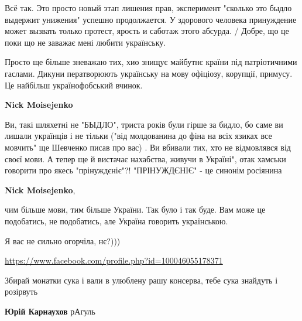 \begin{itemize}
Всё так. Это просто новый этап лишения прав, эксперимент "сколько это быдло
выдержит унижения" успешно продолжается. У здорового человека принуждение может
вызвать только протест, ярость и саботаж этого абсурда. / Добре, що це поки що
не заважає мені любити українську. 

Просто ще більше зневажаю тих, хио знищує майбутнє країни під патріотичними
гаслами. Дикуни ператворюють українську на мову офіціозу, корупції, примусу. Це
найбільш українофобський вчинок.

\begin{itemize}

\textbf{Nick Moisejenko} 

Ви, такі шляхетні не "БЫДЛО", триста років були гірше
за бидло, бо саме ви лишали українців і не тільки ("від молдованина до фіна на
всіх язиках все мовчить" ще Шевченко писав про вас) . Ви вбивали тих, хто не
відмовлявся від своєї мови. А тепер ще й вистачає нахабства, живучи в Україні",
отак хамськи говорити про якесь "прінуждєніє"?! "ПРІНУЖДЄНІЄ" - це синонім
росіянина


\textbf{Nick Moisejenko}, 

чим більше мови, тим більше України. Так було і так буде. Вам може це
подобатись, не подобатись, але Україна говорить українською.

Я вас не сильно огорчіла, нє?)))\Laughey[1.0][white]\Laughey[1.0][white]\Laughey[1.0][white]
💙💛
\end{itemize}

\url{https://www.facebook.com/profile.php?id=100046055178371}\par

Збирай монатки сука і вали в улюблену рашу консерва, тебе сука знайдуть і
розірвуть

\begin{itemize}

\textbf{Юрій Карнаухов} рАгуль🤣🤣💩💩


\end{itemize}
\end{itemize}
